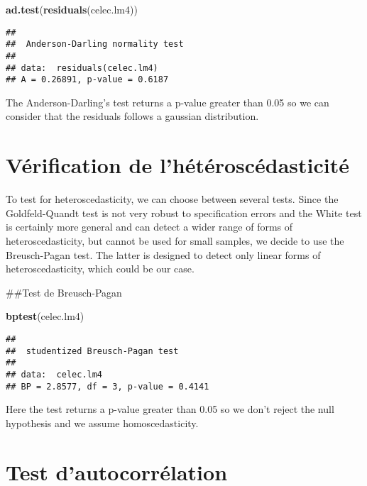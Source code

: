 \documentclass[
]{article}
\newenvironment{Shaded}{\begin{snugshade}}{\end{snugshade}}
\newcommand{\FunctionTok}[1]{\textcolor[rgb]{0.13,0.29,0.53}{\textbf{#1}}}
\newcommand{\NormalTok}[1]{#1}
\begin{document}
\begin{Shaded}
\begin{Highlighting}[]
\FunctionTok{ad.test}\NormalTok{(}\FunctionTok{residuals}\NormalTok{(celec.lm4))}
\end{Highlighting}
\end{Shaded}

\begin{verbatim}
## 
##  Anderson-Darling normality test
## 
## data:  residuals(celec.lm4)
## A = 0.26891, p-value = 0.6187
\end{verbatim}

The Anderson-Darling's test returns a p-value greater than 0.05 so we
can consider that the residuals follows a gaussian distribution.

\section{Vérification de
l'hétéroscédasticité}\label{vuxe9rification-de-lhuxe9tuxe9roscuxe9dasticituxe9-1}

To test for heteroscedasticity, we can choose between several tests.
Since the Goldfeld-Quandt test is not very robust to specification
errors and the White test is certainly more general and can detect a
wider range of forms of heteroscedasticity, but cannot be used for small
samples, we decide to use the Breusch-Pagan test. The latter is designed
to detect only linear forms of heteroscedasticity, which could be our
case.

\#\#Test de Breusch-Pagan

\begin{Shaded}
\begin{Highlighting}[]
\FunctionTok{bptest}\NormalTok{(celec.lm4)}
\end{Highlighting}
\end{Shaded}

\begin{verbatim}
## 
##  studentized Breusch-Pagan test
## 
## data:  celec.lm4
## BP = 2.8577, df = 3, p-value = 0.4141
\end{verbatim}

Here the test returns a p-value greater than 0.05 so we don't reject the
null hypothesis and we assume homoscedasticity.

\section{Test d'autocorrélation}\label{test-dautocorruxe9lation-1}
\end{document}
